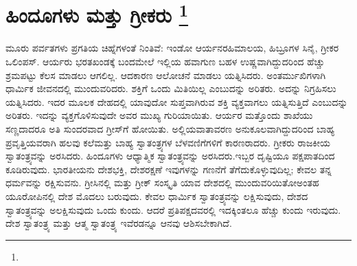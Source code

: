
\chapter[ಹಿಂದೂಗಳು ಮತ್ತು ಗ್ರೀಕರು ]{ಹಿಂದೂಗಳು ಮತ್ತು ಗ್ರೀಕರು \protect\footnote{}}

ಮೂರು ಪರ್ವತಗಳು ಪ್ರಗತಿಯ ಚಿಹ್ನೆಗಳಂತೆ ನಿಂತಿವೆ: ಇಂಡೋ ಆರ್ಯನರ\break ಹಿಮಾಲಯ, ಹಿಬ್ರೂಗಳ ಸಿನೈ, ಗ್ರೀಕರ ಒಲಿಂಪಸ್​. ಆರ್ಯರು ಭರತಖಂಡಕ್ಕೆ ಬಂದಮೇಲೆ ಇಲ್ಲಿಯ ಹವಾಗುಣ ಬಹಳ ಉಷ್ಣವಾಗಿದ್ದುದರಿಂದ ಹೆಚ್ಚು ಶ್ರಮಪಟ್ಟು ಕೆಲಸ ಮಾಡಲು ಆಗಲಿಲ್ಲ. ಆದಕಾರಣ ಆಲೋಚನೆ ಮಾಡಲು ಯತ್ನಿಸಿದರು. ಅಂತರ್ಮುಖಿಗಳಾಗಿ ಧಾರ್ಮಿಕ ಜೀವನದಲ್ಲಿ ಮುಂದುವರಿದರು. ಶಕ್ತಿಗೆ ಒಂದು ಮಿತಿಯಿಲ್ಲ ಎಂಬುದನ್ನು ಅರಿತರು. ಅದನ್ನು ನಿಗ್ರಹಿಸಲು ಯತ್ನಿಸಿದರು. ಇದರ ಮೂಲಕ ದೇಹದಲ್ಲಿ ಯಾವುದೋ ಸುಪ್ತವಾಗಿರುವ ಶಕ್ತಿ ವ್ಯಕ್ತವಾಗಲು ಯತ್ನಿಸುತ್ತಿದೆ ಎಂಬುದನ್ನು ಅರಿತರು. ಇದನ್ನು ವ್ಯಕ್ತಗೊಳಿಸುವುದೇ ಅವರ ಮುಖ್ಯ ಗುರಿಯಾಯಿತು. ಆರ್ಯರ ಮತ್ತೊಂದು ಶಾಖೆಯು ಸಣ್ಣದಾದರೂ ಅತಿ ಸುಂದರವಾದ ಗ್ರೀಸ್​ಗೆ ಹೋಯಿತು. ಅಲ್ಲಿಯ\break ವಾತಾವರಣ ಅನುಕೂಲವಾಗಿದ್ದುದರಿಂದ ಬಾಹ್ಯ ಪ್ರವೃತ್ತಿಯವರಾಗಿ ಹಲವು ಕಲೆ\break ಮತ್ತು ಬಾಹ್ಯ ಸ್ವಾತಂತ್ರ್ಯಗಳ ಬೆಳವಣಿಗೆಗಳಿಗೆ ಕಾರಣರಾದರು. ಗ್ರೀಕರು ರಾಜಕೀಯ ಸ್ವಾತಂತ್ರ್ಯವನ್ನು ಅರಸಿದರು. ಹಿಂದೂಗಳು ಆಧ್ಯಾತ್ಮಿಕ ಸ್ವಾತಂತ್ರ್ಯವನ್ನು ಅರಸಿದರು.\break ಇಬ್ಬರ ದೃಷ್ಟಿಯೂ ಪಕ್ಷಪಾತದಿಂದ ಕೂಡಿರುವುದು. ಭಾರತೀಯನು ದೇಶಭಕ್ತಿ, ದೇಶರಕ್ಷಣೆ ಇವುಗಳನ್ನು ಗಣನೆಗೆ ತೆಗೆದುಕೊಳ್ಳುವುದಿಲ್ಲ; ಕೇವಲ ತನ್ನ ಧರ್ಮವನ್ನು ರಕ್ಷಿಸುವನು. ಗ್ರೀಸಿನಲ್ಲಿ ಮತ್ತು ಗ್ರೀಕ್​ ಸಂಸ್ಕೃತಿ ಯಾವ ದೇಶದಲ್ಲಿ ಮುಂದುವರಿಯಿತೋ\break ಅಂತಹ ಯೂರೋಪಿನಲ್ಲಿ ದೇಶ ಮೊದಲು ಬರುವುದು. ಕೇವಲ ಧಾರ್ಮಿಕ ಸ್ವಾತಂತ್ರ್ಯವನ್ನು ಲಕ್ಷಿಸುವುದು, ದೇಶದ ಸ್ವಾತಂತ್ರ್ಯವನ್ನು ಅಲಕ್ಷಿಸುವುದು ಒಂದು ಕುಂದು. ಆದರೆ ಪ್ರತಿಪಕ್ಷದವರಲ್ಲಿ ಇದಕ್ಕಿಂತಲೂ ಹೆಚ್ಚು ಕುಂದು ಇರುವುದು. ದೇಶ ಸ್ವಾತಂತ್ರ್ಯ ಮತ್ತು ಆತ್ಮ ಸ್ವಾತಂತ್ರ್ಯ ಇವೆರಡನ್ನೂ ಆನವು ಆಶಿಸಬೇಕಾಗಿದೆ.


